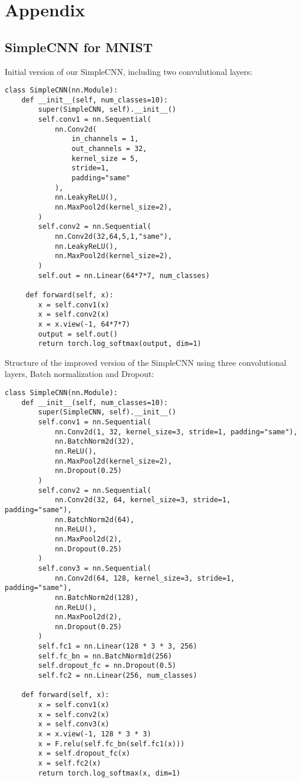 \section{Appendix}
\subsection{SimpleCNN for MNIST}\label{codeSnippets}
Initial version of our SimpleCNN, including two convulutional layers:\@

\begin{verbatim}
class SimpleCNN(nn.Module):
    def __init__(self, num_classes=10):
        super(SimpleCNN, self).__init__()
        self.conv1 = nn.Sequential(
            nn.Conv2d(
                in_channels = 1,
                out_channels = 32,
                kernel_size = 5,
                stride=1,
                padding="same"
            ),
            nn.LeakyReLU(),
            nn.MaxPool2d(kernel_size=2),
        )
        self.conv2 = nn.Sequential(
            nn.Conv2d(32,64,5,1,"same"),
            nn.LeakyReLU(),
            nn.MaxPool2d(kernel_size=2),
        )
        self.out = nn.Linear(64*7*7, num_classes)

     def forward(self, x):
        x = self.conv1(x)
        x = self.conv2(x)
        x = x.view(-1, 64*7*7)
        output = self.out()
        return torch.log_softmax(output, dim=1)
\end{verbatim}


Structure of the improved version of the SimpleCNN using three convolutional layers, Batch normalization and Dropout:\@

\begin{verbatim}
class SimpleCNN(nn.Module):
    def __init__(self, num_classes=10):
        super(SimpleCNN, self).__init__()
        self.conv1 = nn.Sequential(
            nn.Conv2d(1, 32, kernel_size=3, stride=1, padding="same"),
            nn.BatchNorm2d(32),
            nn.ReLU(),
            nn.MaxPool2d(kernel_size=2),
            nn.Dropout(0.25)
        )
        self.conv2 = nn.Sequential(
            nn.Conv2d(32, 64, kernel_size=3, stride=1, padding="same"),
            nn.BatchNorm2d(64),
            nn.ReLU(),
            nn.MaxPool2d(2),
            nn.Dropout(0.25)
        )
        self.conv3 = nn.Sequential(
            nn.Conv2d(64, 128, kernel_size=3, stride=1, padding="same"),
            nn.BatchNorm2d(128),
            nn.ReLU(),
            nn.MaxPool2d(2),
            nn.Dropout(0.25)
        )
        self.fc1 = nn.Linear(128 * 3 * 3, 256)
        self.fc_bn = nn.BatchNorm1d(256)
        self.dropout_fc = nn.Dropout(0.5)
        self.fc2 = nn.Linear(256, num_classes)

    def forward(self, x):
        x = self.conv1(x)
        x = self.conv2(x)
        x = self.conv3(x)
        x = x.view(-1, 128 * 3 * 3)
        x = F.relu(self.fc_bn(self.fc1(x)))
        x = self.dropout_fc(x)
        x = self.fc2(x)
        return torch.log_softmax(x, dim=1)
\end{verbatim}
    

